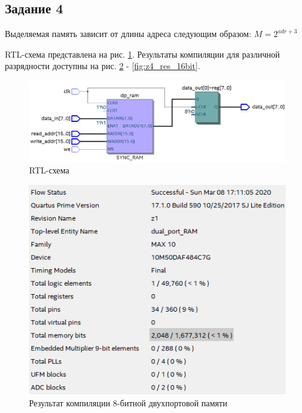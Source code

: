 \documentclass[a4paper,14pt]{article}
\begin{document}
	
	\subsection{Задание 4}
	
	
	Выделяемая память зависит от длины адреса следующим образом: $M = 2^{adr + 3}$
	
	RTL-схема представлена на рис. \ref{fig:z4_rtl_16bit}.
	Результаты компиляции для различной разрядности доступны на рис. \ref{fig:z4_res_8bit} - \ref{fig:z4_res_16bit}.
	\begin{figure}[H]
		\centering
		\includegraphics[width=0.9\linewidth]{images/z4_rtl_16bit}
		\caption{RTL-схема}
		\label{fig:z4_rtl_16bit}
	\end{figure}

	\begin{figure}[H]
		\centering
		\includegraphics[width=0.8\linewidth]{images/z4_res_8bit}
		\caption{Результат компиляции 8-битной двухпортовой памяти}
		\label{fig:z4_res_8bit}
	\end{figure}
\end{document}

